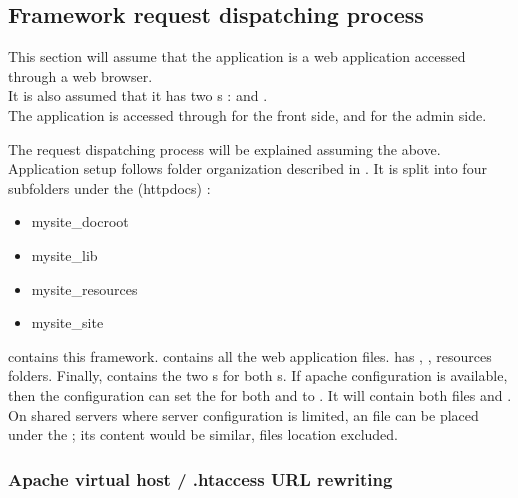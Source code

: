 \documentclass[pdftex,12pt,a4paper]{article}
\begin{document}
\subsection{Framework request dispatching process} \label{sec:framework-request-dispatching-process}

This section will assume that the application is a web application accessed through a web browser. \\
It is also assumed that it has two s :  and . \\
The application is accessed through  for the front side, and  for the admin side.

The request dispatching process will be explained assuming the above. Application setup follows folder organization described in . It is split into four subfolders under the  (\eg httpdocs) :
\begin{itemize}
    \item mysite\_docroot
    \item mysite\_lib
    \item mysite\_resources
    \item mysite\_site
\end{itemize}

 contains this framework.  contains all the web application files.  has , ,  resources folders.
Finally,  contains the two s for both s.
If apache configuration is available, then the  configuration can set the  for both  and  to . It will contain both  files and .
On shared servers where server configuration is limited, an  file can be placed under the ; its content would be similar,  files location excluded.

\subsubsection{Apache virtual host / .htaccess URL rewriting}
\end{document}
